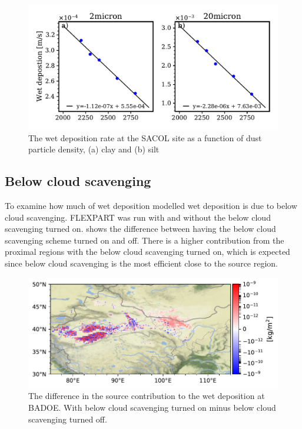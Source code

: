 \begin{figure}[hptb]
    \centering
    \includegraphics[width=\textwidth]{texfiles/figs/wetdep_function_of_density.pdf}
    \caption{The wet deposition rate at the SACOL site as a function of dust particle density, (a) clay and (b) silt}
    \label{fig:wet_dep_density}
\end{figure}

\subsection{Below cloud scavenging}\label{wet:dep_sensitivty}
To examine how much of wet deposition modelled wet deposition is due to below cloud scavenging. FLEXPART was run with and without the below cloud scavenging turned on. 
 shows the difference between having the below cloud scavenging scheme turned on and off. 
There is a higher contribution from the proximal regions with the below cloud scavenging turned on, which is expected since below cloud scavenging is the most efficient close to the source region.  
\begin{figure}[htbp]
    \centering
    \includegraphics[width=\textwidth]{texfiles/figs/no_scav_test.pdf}
    \caption{The difference in the source contribution to the wet deposition at BADOE. With below cloud scavenging turned on minus below cloud scavenging turned off.}
    \label{fig:scav_sensitivty}
\end{figure}

